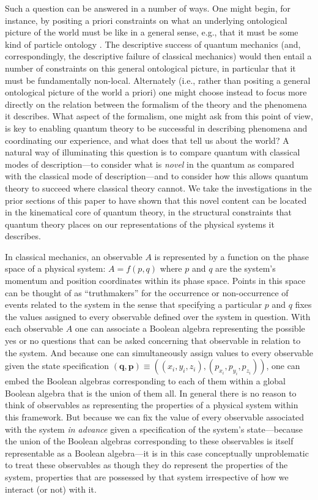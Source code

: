 Such a question can be answered in a number of ways. One might begin, for instance, by positing a priori constraints on what an underlying ontological picture of the world must be like in a general sense, e.g., that it must be some kind of particle ontology \citep[cf.][]{Albert 2018}. The descriptive success of quantum mechanics (and, correspondingly, the descriptive failure of classical mechanics) would then entail a number of constraints on this general ontological picture, in particular that it must be fundamentally non-local. Alternately (i.e., rather than positing a general ontological picture of the world a priori) one might choose instead to focus more directly on the relation between the formalism of the theory and the phenomena it describes. What aspect of the formalism, one might ask from this point of view, is key to enabling quantum theory to be successful in describing phenomena and coordinating our experience, and what does that tell us about the world? A natural way of illuminating this question is to compare quantum with classical modes of description---to consider what is \emph{novel} in the quantum as compared with the classical mode of description---and to consider how this allows quantum theory to succeed where classical theory cannot. We take the investigations in the prior sections of this paper to have shown that this novel content can be located in the kinematical core of quantum theory, in the structural constraints that quantum theory places on our representations of the physical systems it describes.

In classical mechanics, an observable $A$ is represented by a function on the phase space of a physical system: $A = f(p, q)$ where $p$ and $q$ are the system's momentum and position coordinates within its phase space. Points in this space can be thought of as ``truthmakers'' \citep[]{Bub and Pitowsky 2010} for the occurrence or non-occurrence of events related to the system in the sense that specifying a particular $p$ and $q$ fixes the values assigned to every observable defined over the system in question. With each observable $A$ one can associate a Boolean algebra representing the possible yes or no questions that can be asked concerning that observable in relation to the system. And because one can simultaneously assign values to every observable given the state specification $(\mathbf{q}, \mathbf{p}) \equiv ((x_i, y_i, z_i), (p_{x_i}, p_{y_i}, p_{z_i}))$, one can embed the Boolean algebras corresponding to each of them within a global Boolean algebra that is the union of them all. In general there is no reason to think of observables as representing the properties of a physical system within this framework. But because we can fix the value of every observable associated with the system \emph{in advance} given a specification of the system's state---because the union of the Boolean algebras corresponding to these observables is itself representable as a Boolean algebra---it is in this case conceptually unproblematic to treat these observables as though they do represent the properties of the system, properties that are possessed by that system irrespective of how we interact (or not) with it.

